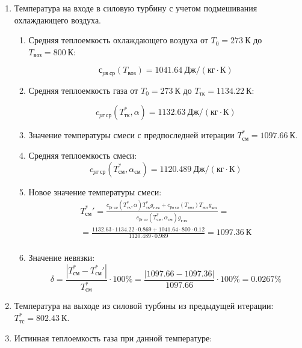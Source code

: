 \documentclass[a4paper,12pt]{article}
\begin{document}
\begin{enumerate}
	\item Температура на входе в силовую турбину с учетом подмешивания охлаждающего воздуха.
	\begin{enumerate}

		\item Средняя теплоемкость охлаждающего воздуха от $T_0 = 273\ К$ до $T_{воз} = 800\ К $:

		\[
			с_{pв\ ср} (T_{воз}) = 1041.64\ Дж/(кг \cdot К)
		\]

		\item Средняя теплоемкость газа от $T_0 = 273\ К$ до $T_{тк} = 1134.22\ К$:

		\[
			c_{pг\ ср} (T_{тк}^*, \alpha) = 1132.63\ Дж/(кг \cdot К)
		\]

		\item Значение температуры смеси с предпоследней итерации $T_{см}^* = 1097.66\ К$.

		\item Средняя теплоемкость смеси:
		\[
			c_{pг\ ср} (T_{см}^*, \alpha_{см}) = 1120.489\ Дж/(кг \cdot К)
		\]

		\item Новое значение температуры смеси:
		\begin{gather*}
			T_{см}^*\prime = \frac{
                        c_{pг\ ср} (T_{тк}^*, \alpha) T_{тк}^* g_{г.тк} + c_{pв\ ср} (T_{воз}) T_{воз} g_{воз}
                    }{
                        c_{pг\ ср} (T_{см}^{*}, \alpha_{см}) g_{г.тс}
                    } =\\
			= \frac{
                        1132.63 \cdot 1134.22 \cdot
						0.869 +
						1041.64 \cdot 800 \cdot
						0.12
                    }{
                        1120.489 \cdot  0.989
                    } =
			1097.36\ К\\
		\end{gather*}

		\item Значение невязки:
		\[
			\delta =\frac{ \left| T_{см}^{*} - T_{см}^*\prime \right| }{T_{см}^{*}} \cdot 100 \% =
				\frac{
                        \left| 1097.66 - 1097.36 \right|
                    }{
                        1097.66
                    } \cdot 100 \% =
			0.0267 \%
		\]


	\end{enumerate}
	
	\item Температура на выходе из силовой турбины из предыдущей итерации: $ T_{тс}^* = 802.43\ К$.

	\item Истинная теплоемкость газа при данной температуре:
	

\end{enumerate}
\end{document}
